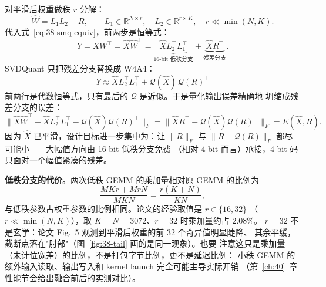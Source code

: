 对平滑后权重做秩 $r$ 分解：
\begin{equation}
  \widehat W=L_1L_2+R,\qquad
  L_1\in\mathbb{R}^{N\times r},\quad
  L_2\in\mathbb{R}^{r\times K},\quad
  r\ll\min(N,K).
  \label{eq:38-decomp}
\end{equation}
代入式~\ref{eq:38-smq-equiv}，前两步是恒等式：
\begin{equation}
  Y=XW^{\top}
   =\widehat X\widehat W^{\top}
   =\underbrace{\widehat XL_2^{\top}L_1^{\top}}_{\text{16-bit 低秩分支}}
   +\underbrace{\widehat XR^{\top}}_{\text{残差分支}}.
  \label{eq:38-branch}
\end{equation}
SVDQuant 只把残差分支替换成 W4A4：
\begin{equation}
  \boxed{
  Y\approx
  \widehat XL_2^{\top}L_1^{\top}
  +\mathcal Q(\widehat X)\,\mathcal Q(R)^{\top}}
  \label{eq:38-svdq}
\end{equation}
前两行是代数恒等式，只有最后的 $\mathcal Q$ 是近似。于是量化输出误差精确地
坍缩成残差分支的误差：
\begin{equation}
  \bigl\|\widehat X\widehat W^{\top}-\widehat XL_2^{\top}L_1^{\top}
        -\mathcal Q(\widehat X)\mathcal Q(R)^{\top}\bigr\|_F
  =\bigl\|\widehat XR^{\top}-\mathcal Q(\widehat X)\mathcal Q(R)^{\top}\bigr\|_F
  =E(\widehat X,R).
  \label{eq:38-residual-only}
\end{equation}
因为 $\widehat X$ 已平滑，设计目标进一步集中为：让 $\|R\|_F$ 与
$\|R-\mathcal Q(R)\|_F$ 都尽可能小——大幅值方向由 16-bit 低秩分支免费
（相对 4 bit 而言）承接，4-bit 码只面对一个幅值紧凑的残差。

\textbf{低秩分支的代价}。两次低秩 GEMM 的乘加量相对原 GEMM 的比例为
\begin{equation}
  \frac{MKr+MrN}{MKN}=\frac{r(K+N)}{KN},
  \label{eq:38-flops}
\end{equation}
与低秩参数占权重参数的比例相同。论文的经验取值是 $r\in\{16,32\}$
（$r\ll\min(N,K)$），取 $K=N=3072$、$r=32$ 时乘加量约占 $2.08\%$。
$r=32$ 不是玄学：论文 Fig.~5 观测到平滑后权重的前 32 个奇异值明显陡降、
其余平缓，截断点落在"肘部"（图~\ref{fig:38-tail} 画的是同一现象）。也要
注意这只是乘加量（未计位宽差）的比例，不是打包字节比例，更不是延迟比例：
小秩 GEMM 的额外输入读取、输出写入和 kernel launch 完全可能主导实际开销
（第~\ref{ch:40}~章性能节会给出融合前后的实测对比）。

